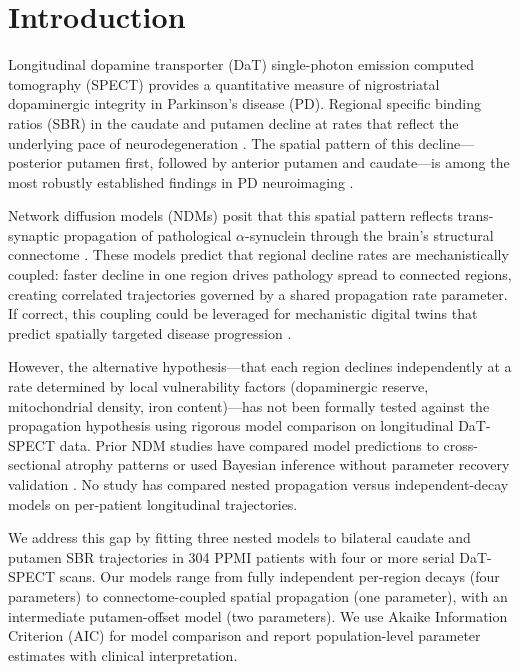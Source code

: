 \section{Introduction}

Longitudinal dopamine transporter (DaT) single-photon emission computed tomography (SPECT) provides a quantitative measure of nigrostriatal dopaminergic integrity in Parkinson's disease (PD). Regional specific binding ratios (SBR) in the caudate and putamen decline at rates that reflect the underlying pace of neurodegeneration \cite{booij1997, siderowf2020, ren2024}. The spatial pattern of this decline---posterior putamen first, followed by anterior putamen and caudate---is among the most robustly established findings in PD neuroimaging \cite{kish1988, brooks1990, kim2022}.

Network diffusion models (NDMs) posit that this spatial pattern reflects trans-synaptic propagation of pathological $\alpha$-synuclein through the brain's structural connectome \cite{raj2012, pandya2019, vogel2023}. These models predict that regional decline rates are mechanistically coupled: faster decline in one region drives pathology spread to connected regions, creating correlated trajectories governed by a shared propagation rate parameter. If correct, this coupling could be leveraged for mechanistic digital twins that predict spatially targeted disease progression \cite{dupre2026phase2}.

However, the alternative hypothesis---that each region declines independently at a rate determined by local vulnerability factors (dopaminergic reserve, mitochondrial density, iron content)---has not been formally tested against the propagation hypothesis using rigorous model comparison on longitudinal DaT-SPECT data. Prior NDM studies have compared model predictions to cross-sectional atrophy patterns \cite{raj2012, pandya2019, abdelgawad2022} or used Bayesian inference without parameter recovery validation \cite{schafer2021}. No study has compared nested propagation versus independent-decay models on per-patient longitudinal trajectories.

We address this gap by fitting three nested models to bilateral caudate and putamen SBR trajectories in 304 PPMI patients with four or more serial DaT-SPECT scans. Our models range from fully independent per-region decays (four parameters) to connectome-coupled spatial propagation (one parameter), with an intermediate putamen-offset model (two parameters). We use Akaike Information Criterion (AIC) for model comparison and report population-level parameter estimates with clinical interpretation.

